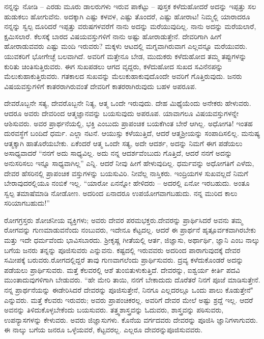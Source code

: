 ನನ್ನನ್ನು ನೋಡಿ – ಎರಡು ಮೂರು ಡಾಲರುಗಳು ಇರುವ ಪಾಕೆಟ್ಟು – ಪುಸ್ತಕ ಕಳೆದುಹೋದರೆ ಅದನ್ನು ಇಪ್ಪತ್ತು ಸಲ ಹುಡುಕಲು ಹೋಗುವೆನು. ಅದಕ್ಕಾಗಿ ಎಷ್ಟು ಕಳವಳ, ಎಷ್ಟು ತೊಂದರೆ, ಎಷ್ಟು ಹೋರಾಟ! ನಿಮ್ಮಲ್ಲಿ ಯಾರಾದರೂ ನನ್ನನ್ನು ಸ್ವಲ್ಪ ದೂರಿದರೆ ಇಪ್ಪತ್ತು ವರುಷಗಳವರೆಗೆ ನಾನು ಅದನ್ನು ಮರೆಯುವುದಿಲ್ಲ. ನಾನು ಅದನ್ನು ಮರೆಯಲಾರೆ, ಕ್ಷಮಿಸಲಾರೆ. ಕೆಲಸಕ್ಕೆ ಬಾರದ ವಿಷಯವಸ್ತುಗಳಿಗೆ ನಾನು ಅಷ್ಟು ಹೋರಾಡುತ್ತೇನೆ. ದೇವರಿಗಾಗಿ ಹೀಗೆ ಹೋರಾಡುವವರು ಎಷ್ಟು ಮಂದಿ ಇರುವರು? ಮಕ್ಕಳು ಆಟದಲ್ಲಿ ಮಗ್ನವಾಗಿರುವಾಗ ಎಲ್ಲವನ್ನೂ ಮರೆಯುವರು. ಯುವಕರಿಗೆ ಭೋಗೇಚ್ಛೆ ಬಲವಾಗಿದೆ. ಅವರಿಗೆ ಮತ್ತೇನೂ ಬೇಡ, ಮುದುಕರು ಕಳೆದುಹೋದ ತಮ್ಮ ತಪ್ಪುಗಳನ್ನು ಕುರಿತು ಚಿಂತಿಸುತ್ತಿರುವರು. ಈಗ ಸುಖಪಡಲು ಆಗದ ವೃದ್ದರು, ಕಳೆದುಹೋದ ಸುಖದ ಸವಿನೆನಪನ್ನು ಮೆಲುಕುಹಾಕುತ್ತಿರುವರು. ಗತಕಾಲದ ಸುಖವನ್ನು ಮೆಲುಕುಹಾಕುವುದೊಂದೇ ಅವರಿಗೆ ಗೊತ್ತಿರುವುದು. ಜನರು ವಿಷಯವಸ್ತುಗಳಿಗೆ ಕಾತರರಾಗಿರುವಂತೆ ದೇವರಿಗೆ ಕಾತರರಾಗಿರುವುದು ಬಹಳ ಅಪರೂಪ.

ದೇವರೊಬ್ಬನೇ ಸತ್ಯ, ದೇವರೊಬ್ಬನೇ ನಿತ್ಯ, ಆತ್ಮ ಒಂದೇ ಇರುವುದು. ದೇಹ ಮಿಥ್ಯೆಯೆಂದು ಅನೇಕರು ಹೇಳುವರು. ಆದರೂ ಅವರು ದೇವರಿಂದ ಆತ್ಮಜ್ಞಾನವನ್ನು ಬಯಸುವುದು ಅಪರೂಪ. ಯಾವಾಗಲೂ ವಿಷಯವಸ್ತುಗಳನ್ನೇ ಆಶಿಸುವರು. ಅವರ ಪ್ರಾರ್ಥನೆಯಲ್ಲಿ, ಭಕ್ತಿ ಎಂಬುದು ಪ್ರಾಪಂಚಿಕ ಬಯಕೆಗಿಂತ ಬೇರೆ ಆಗಿಲ್ಲ. ಅಧೋಗತಿ! ಇಂತಹ ದುರವಸ್ಥೆಗೆ ಬಂದಿದೆ ಧರ್ಮ. ಎಲ್ಲಾ ನಟನೆ. ಆಯುಸ್ಸು ಕಳೆಯುತ್ತಿದೆ, ಆದರೆ ಆತ್ಮಶ‍್ರೀಯನ್ನು ಸಂಪಾದಿಸಲಿಲ್ಲ. ಮನುಷ್ಯ ಆತ್ಮಕ್ಕಾಗಿ ಹಾತೊರೆಯಬೇಕು. ಏಕೆಂದರೆ ಆತ್ಮ ಒಂದೇ ಸತ್ಯ, ಅದೇ ಆದರ್ಶ, ಅದನ್ನು ನಿಮಗೆ ಈಗ ಪಡೆಯಲು ಅಸಾಧ್ಯವಾದರೆ “ನನಗೆ ಅದು ಸಾಧ್ಯವಿಲ್ಲ. ಅದು ನನ್ನ ಆದರ್ಶವೆಂಬುದು ಗೊತ್ತಿದೆ, ಆದರೆ ನನಗೆ ಅದನ್ನು ಅನುಸರಿಸಲು ಇನ್ನೂ ಸಾಧ್ಯವಾಗಿಲ್ಲ” ಎನ್ನಿ. ಆದರೆ ನೀವು ಹೀಗೆ ಹೇಳುವುದಿಲ್ಲ. ಧರ್ಮವನ್ನು ಅಧೋಗತಿಗೆ ಎಳೆದು, ದೇವರ ಹೆಸರಿನಲ್ಲಿ ಪ್ರಾಪಂಚಿಕ ವಸ್ತುಗಳನ್ನು ಬಯಸುವಿರಿ. ನೀವೆಲ್ಲ ನಾಸ್ತಿಕರು. ಇಂದ್ರಿಯಗಳ ಸುಖವಲ್ಲದೆ ನಿಮಗೆ ಬೇರಾವುದರಲ್ಲಿಯೂ ನಂಬಿಕೆ ಇಲ್ಲ. “ಯಾರೋ ಏನನ್ನೋ ಹೇಳಿದರು – ಅದರಲ್ಲಿ ಏನೋ ಇರಬಹುದು. ಅಂತೂ ಸ್ವಲ್ಪ ತಮಾಷೆಮಾಡಿ ನೋಡೋಣ. ಅದರಿಂದ ಏನಾದರೂ ಉಪಯೋಗವಾಗಬಹುದು. ನನ್ನ ಮುರಿದ ಕಾಲು ಸರಿಯಾಗಬಹುದು!”

ರೋಗಗ್ರಸ್ತರು ಶೋಚನೀಯ ವ್ಯಕ್ತಿಗಳು; ಅವರು ದೇವರ ಪರಮಭಕ್ತರು.\break ದೇವರನ್ನು ಪ್ರಾರ್ಥಿಸಿದರೆ ಅವನು ತಮ್ಮ ರೋಗವನ್ನು ಗುಣಮಾಡುವನೆಂದು ನಂಬುವರು, ಇದೇನೂ ಕೆಟ್ಟದಲ್ಲ. ಆದರೆ ಈ ಪ್ರಾರ್ಥನೆ ಹೃತ್ಪೂರ್ವಕವಾಗಿರಬೇಕು ಮತ್ತು ಇದೇ ಧರ್ಮವೆಂದು ಭಾವಿಸಬಾರದು. ಶ‍್ರೀಕೃಷ್ಣ ಗೀತೆಯಲ್ಲಿ ಆರ್ತ, ಜಿಜ್ಞಾಸು, ಅರ್ಥಾರ್ಥಿ, ಜ್ಞಾನಿ ಎಂಬ ನಾಲ್ಕು ಬಗೆಯ ಜನರು ತನ್ನನ್ನು ಪೂಜಿಸುವರು ಎನ್ನುವನು. ಕಷ್ಟದಲ್ಲಿ ಇರುವವರು ಅದರಿಂದ ಪಾರಾಗುವುದಕ್ಕೆ ದೇವರ ಸಮೀಪಕ್ಕೆ ಬರುವರು.\break ರೋಗದಲ್ಲಿದ್ದರೆ ತಾವು ಗುಣವಾಗಲೆಂದು ಪ್ರಾರ್ಥಿಸುವರು. ದ್ರವ್ಯ ಕಳೆದುಕೊಂಡರೆ ಅದನ್ನು ಪಡೆಯಲು ಪ್ರಾರ್ಥಿಸುವರು. ಮತ್ತೆ ಕೆಲವರಲ್ಲಿ ಆಶೆ ತುಂಬಿತುಳುಕುತ್ತಿದೆ. ದೇವರನ್ನು, ಐಶ್ವರ್ಯ ಕೀರ್ತಿ ಪದವಿ ಮುಂತಾದುವುಗಳಿಗಾಗಿ ಬೇಡುವರು. “ಹೇ ಮೇರಿ ತಾಯಿ, ನನಗೆ ಬೇಕಾದುದು ದೊರೆತರೆ ನಿನಗೆ ಪೂಜೆ ಮಾಡಿಸುತ್ತೇನೆ. ನನ್ನ ಪ್ರಾರ್ಥನೆಯನ್ನು ಈಡೇರಿಸಿದರೆ ದೇವರನ್ನು ಪೂಜಿಸುತ್ತೇನೆ, ನಿನಗೂ ಎಲ್ಲದರಲ್ಲೂ ಒಂದು ಪಾಲು ಕೊಡುತ್ತೇನೆ" ಎನ್ನುವರು. ಮತ್ತೆ ಕೆಲವರು ಇರುವರು; ಅವರು ಪ್ರಾಪಂಚಿಕರಲ್ಲ. ಅವರಿಗೆ ದೇವರ ಮೇಲೆ ಅಷ್ಟು ಶ್ರದ್ದೆ ಇಲ್ಲ. ಆದರೆ ಅವನನ್ನು ತಿಳಿದುಕೊಳ್ಳಬೇಕೆಂದು ಬಯಸುವರು. ತತ್ತ್ವಶಾಸ್ತ್ರವನ್ನು ಓದುವರು, ಶಾಸ್ತ್ರವನ್ನು ಪಠಿಸುವರು, ಉಪನ್ಯಾಸಗಳನ್ನು ಕೇಳುವರು. ಅವರು ಜಿಜ್ಞಾಸುಗಳು. ಕೊನೆಯ ವರ್ಗದವರು ದೇವರನ್ನು ಪೂಜಿಸಿ ಜ್ಞಾನಿಗಳಾಗುವರು. ಈ ನಾಲ್ಕು ಬಗೆಯ ಜನರೂ ಒಳ್ಳೆಯವರೆ, ಕೆಟ್ಟವರಲ್ಲ. ಎಲ್ಲರೂ ದೇವರನ್ನು\break ಪೂಜಿಸುವವರು.

